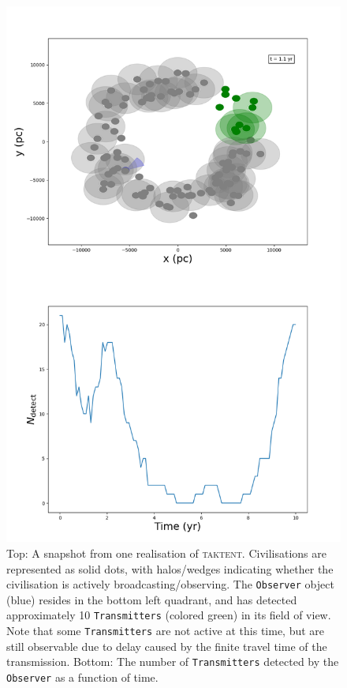 \documentclass[RNAAS]{aastex62}
\begin{document}
\begin{figure}[h!]
\begin{center}
\includegraphics[scale=0.5]{combined.png}
\caption{Top:  A snapshot from one realisation of \textsc{taktent}.  Civilisations are represented as solid dots, with halos/wedges indicating whether the civilisation is actively broadcasting/observing.  The \texttt{Observer} object (blue) resides in the bottom left quadrant, and has detected approximately 10 \texttt{Transmitters} (colored green) in its field of view.  Note that some \texttt{Transmitters} are not active at this time, but are still observable due to delay caused by the finite travel time of the transmission. Bottom: The number of \texttt{Transmitters} detected by the \texttt{Observer} as a function of time. \label{fig:1}}
\end{center}
\end{figure}
\end{document}
